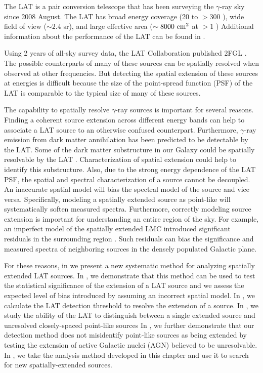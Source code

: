 The LAT is a pair conversion telescope that has been surveying
the $\gamma$-ray sky since 2008 August.  The LAT has broad energy
coverage (20 \mev to $>300$ \gev), wide field of view ($\sim 2.4$
sr), and large effective area ($\sim 8000\ \cm^2$ at $>1$ \gev)
Additional information about the performance of the LAT can be found
in \cite{atwood_2009a_large-telescope}.

Using 2 years of all-sky survey data, the LAT Collaboration published
2FGL \citep[2FGL,][]{nolan_2012_fermi-large}.  The possible counterparts
of many of these sources can be spatially resolved when observed at other
frequencies. But detecting the spatial extension of these sources at \gev
energies is difficult because the size of the point-spread function (PSF)
of the LAT is comparable to the typical size of many of these sources.

The capability to spatially resolve \gev $\gamma$-ray sources is
important for several reasons.  Finding a coherent source extension
across different energy bands can help to associate a LAT source to an
otherwise confused counterpart.  Furthermore, $\gamma$-ray emission from
dark matter annihilation has been predicted to be detectable by the LAT.
Some of the dark matter substructure in our Galaxy could be spatially
resolvable by the LAT \citep{baltz_2008a_pre-launch-estimates}.
Characterization of spatial extension could help to identify this
substructure.  Also, due to the strong energy dependence of the LAT
PSF, the spatial and spectral characterization of a source cannot be
decoupled. An inaccurate spatial model will bias the spectral model of the
source and vice versa. Specifically, modeling a spatially extended source
as point-like will systematically soften measured spectra. Furthermore,
correctly modeling source extension is important for understanding an
entire region of the sky. For example, an imperfect model of the spatially
extended LMC introduced significant residuals in the surrounding region
\citep{abdo_2010b_fermi-large,nolan_2012_fermi-large}.  Such residuals
can bias the significance and measured spectra of neighboring sources
in the densely populated Galactic plane.

 For these reasons, in 
we present a new systematic method for analyzing spatially extended LAT
sources.  In , we demonstrate that this method
can be used to test the statistical significance of the extension of a LAT
source and we assess the expected level of bias introduced by assuming
an incorrect spatial model.  In ,
we calculate the LAT detection threshold to resolve the extension
of a source.  In , we study
the ability of the LAT to distinguish between a single extended
source and unresolved closely-spaced point-like sources In
, we further demonstrate that our
detection method does not misidentify point-like sources as being
extended by testing the extension of active Galactic nuclei (AGN)
believed to be unresolvable.  
In , we take the analysis
method developed in this chapter and use it to 
search for new spatially-extended sources.


